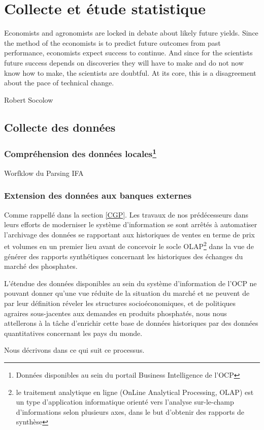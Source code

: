 \chapter{Collecte et étude statistique}
\epigraph{Economists and agronomists are locked in debate about likely
future yields. Since the method of the economists is to predict
future outcomes from past performance, economists expect
success to continue. And since for the scientists future success
depends on discoveries they will have to make and do not now
know how to make, the scientists are doubtful. At its core, this is
a disagreement about the pace of technical change.}{Robert
Socolow}	
\cleardoublepage

	\section{Collecte des données}
	\subsection{Compréhension des données locales\protect\footnote{Données disponibles au sein du portail Business Intelligence de l'OCP}}
	\begin{Huge}{ Worfklow du Parsing IFA }
	\end{Huge}
	\subsection{Extension des données aux banques externes}
	Comme rappellé dans la section \ref{CGP}. Les travaux de nos prédécesseurs dans leurs efforts de moderniser le système d'information se sont arrêtés à automatiser l'archivage des données se rapportant aux historiques de ventes en terme de prix et volumes en un premier lieu\cite{CHEMLAL} avant de concevoir le socle OLAP\footnote{le traitement analytique en ligne (OnLine Analytical Processing, OLAP) est un type d'application informatique orienté vers l'analyse sur-le-champ d'informations selon plusieurs axes, dans le but d'obtenir des rapports de synthèse} dans la vue de générer des rapports synthétiques concernant les historiques des échanges du marché des phosphates.
	\par
	L'étendue des données disponibles au sein du système d'information de l'OCP ne pouvant donner qu'une vue réduite de la situation du marché et ne peuvent de par leur définition réveler les structures socioéconomiques,  et de politiques agraires sous-jacentes aux demandes en produits phosphatés, nous nous attellerons à la tâche d'enrichir cette base de données historiques par des données quantitatives concernant les pays du monde.
	\par
	Nous décrivons dans ce qui suit ce processus. 
